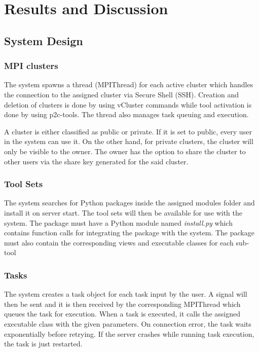 \documentclass[journal]{./IEEE/IEEEtran}
\begin{document}
    
    


\section{Results and Discussion}
	\subsection{System Design}
		\subsubsection{MPI clusters} 
		The system spawns a thread (MPIThread) for each active cluster which handles the connection to the assigned cluster via Secure Shell (SSH). Creation and deletion of clusters is done by using vCluster commands while tool activation is done by using p2c-tools. The thread also manages task queuing and execution.
		
		A cluster is either classified as public or private. If it is set to public, every user in the system can use it. On the other hand, for private clusters, the cluster will only be visible to the owner. The owner has the option to share the cluster to other users via the share key generated for the said cluster. 		

		\subsubsection{Tool Sets} 
		The system searches for Python packages inside the assigned modules folder and install it on server start. The tool sets will then be available for use with the system. The package must have a Python module named \emph{install.py} which contains function calls for integrating the package with the system. The package must also contain the corresponding views and executable classes for each sub-tool  

		\subsubsection{Tasks} 
		The system creates a task object for each task input by the user. A signal will then be sent and it is then received by the corresponding MPIThread which queues the task for execution. When a task is executed, it calls the assigned executable class with the given parameters. On connection error, the task waits exponentially before retrying. If the server crashes while running task execution, the task is just restarted.				
		
\end{document}
